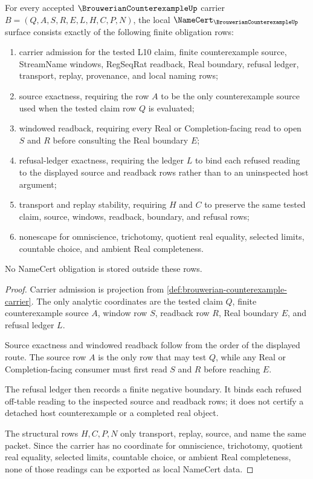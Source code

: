 \begin{theorem}\label{thm:brouwerian-counterexample-namecert-obligations}
For every accepted $\BrouwerianCounterexampleUp$ carrier $B=(Q,A,S,R,E,L,H,C,P,N)$, the local $\NameCert_{\BrouwerianCounterexampleUp}$ surface consists exactly of the following finite obligation rows:
\begin{enumerate}
\item carrier admission for the tested L10 claim, finite counterexample source, StreamName windows, RegSeqRat readback, Real boundary, refusal ledger, transport, replay, provenance, and local naming rows;
\item source exactness, requiring the row $A$ to be the only counterexample source used when the tested claim row $Q$ is evaluated;
\item windowed readback, requiring every Real or Completion-facing read to open $S$ and $R$ before consulting the Real boundary $E$;
\item refusal-ledger exactness, requiring the ledger $L$ to bind each refused reading to the displayed source and readback rows rather than to an uninspected host argument;
\item transport and replay stability, requiring $H$ and $C$ to preserve the same tested claim, source, windows, readback, boundary, and refusal rows;
\item nonescape for omniscience, trichotomy, quotient real equality, selected limits, countable choice, and ambient Real completeness.
\end{enumerate}
No NameCert obligation is stored outside these rows.
\end{theorem}
\begin{proof}
Carrier admission is projection from \autoref{def:brouwerian-counterexample-carrier}. The only analytic coordinates are the tested claim $Q$, finite counterexample source $A$, window row $S$, readback row $R$, Real boundary $E$, and refusal ledger $L$.

Source exactness and windowed readback follow from the order of the displayed route. The source row $A$ is the only row that may test $Q$, while any Real or Completion-facing consumer must first read $S$ and $R$ before reaching $E$.

The refusal ledger then records a finite negative boundary. It binds each refused off-table reading to the inspected source and readback rows; it does not certify a detached host counterexample or a completed real object.

The structural rows $H,C,P,N$ only transport, replay, source, and name the same packet. Since the carrier has no coordinate for omniscience, trichotomy, quotient real equality, selected limits, countable choice, or ambient Real completeness, none of those readings can be exported as local NameCert data.
\end{proof}

